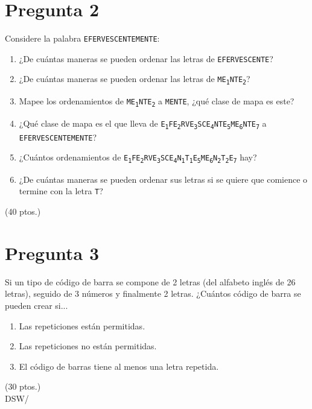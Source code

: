 \documentclass[spanish, fleqn]{article}
\begin{document}
	\section*{Pregunta 2}
	Considere la palabra \texttt{EFERVESCENTEMENTE}:
    \begin{enumerate}
    \item ¿De cuántas maneras se pueden ordenar las letras de \texttt{EFERVESCENTE}?
    \item ¿De cuántas maneras se pueden ordenar las letras de \texttt{ME\textsubscript{1}NTE\textsubscript{2}}?
    \item Mapee los ordenamientos de \texttt{ME\textsubscript{1}NTE\textsubscript{2}} a \texttt{MENTE}, ¿qué clase de mapa es este?
    \item ¿Qué clase de mapa es el que lleva de \texttt{E\textsubscript{1}FE\textsubscript{2}RVE\textsubscript{3}SCE\textsubscript{4}NTE\textsubscript{5}ME\textsubscript{6}NTE\textsubscript{7}} a  \texttt{EFERVESCENTEMENTE}?
    \item ¿Cuántos ordenamientos de \texttt{E\textsubscript{1}FE\textsubscript{2}RVE\textsubscript{3}SCE\textsubscript{4}N\textsubscript{1}T\textsubscript{1}E\textsubscript{5}ME\textsubscript{6}N\textsubscript{2}T\textsubscript{2}E\textsubscript{7}} hay?
    \item ¿De cuántas maneras se pueden ordenar sus letras si se quiere que comience o termine con la letra \texttt{T}?
    \end{enumerate}
    
    
	\hfill (40 ptos.)
	
	\section*{Pregunta 3}
    Si un tipo de código de barra se compone de 2 letras 
    (del alfabeto inglés de 26 letras), seguido de 3 números 
    y finalmente 2 letras. ¿Cuántos código de barra se pueden
    crear si...
    
    \begin{enumerate}
    	\item Las repeticiones están permitidas.
        \item Las repeticiones no están permitidas.
        \item El código de barras tiene al menos una letra repetida.
    \end{enumerate}
	
	
	\hfill (30 ptos.)\\
	
	
	\vfill\hfill DSW/\LaTeXe
\end{document}
